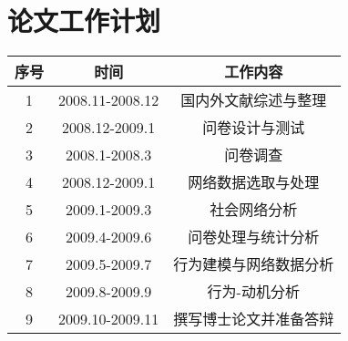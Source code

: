 \documentclass[12pt,a4paper]{ctexart}
\begin{document}
\section{论文工作计划}
\begin{center}
  \begin{tabular}[center]{|c|c|c|}
 \hline
序号&时间&工作内容\\
\hline
1&2008.11-2008.12&国内外文献综述与整理\\
\hline
2&2008.12-2009.1&问卷设计与测试\\
\hline
3&2008.1-2008.3&问卷调查\\
\hline
4&2008.12-2009.1&网络数据选取与处理\\
\hline
5&2009.1-2009.3&社会网络分析\\
\hline
6&2009.4-2009.6&问卷处理与统计分析\\
\hline
7&2009.5-2009.7&行为建模与网络数据分析\\
\hline
8&2009.8-2009.9&行为-动机分析\\
\hline
9&2009.10-2009.11&撰写博士论文并准备答辩\\   
\hline
  \end{tabular}
\end{center}







\end{document}

